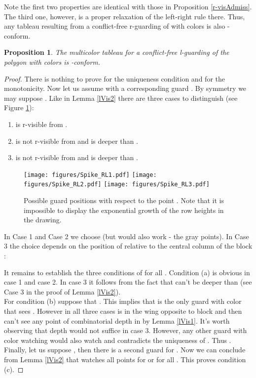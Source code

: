 \documentclass[a4paper,USenglish,numberwithinsect]{lipics}
\theoremstyle{plain}
\newtheorem{proposition}[theorem]{Proposition}
\begin{document}
Note the first two properties are identical with
those 
in Proposition \ref{r-visAdmiss}.
The third one, however,  is a proper relaxation of the left-right rule  there.
Thus, any tableau  resulting from a conflict-free
r-guarding
of  with  colors is also -conform.
\begin{proposition} \label{l-visAdmiss}
The multicolor tableau   for a
conflict-free
l-guarding of the polygon  with  colors is
-conform.
\end{proposition}
\begin{proof}
There is nothing to prove for the uniqueness condition and for the
monotonicity.
Now let us assume  with a
corresponding guard .
By symmetry we may suppose . Like in  Lemma
\ref{lVis2}
there are three cases to distinguish (see Figure \ref{three_guard_pos}):
\begin{enumerate}
\item  is r-visible from .
\item  is not r-visible from  and  is deeper than .
\item   is not r-visible from  and  is deeper than .
\end{enumerate}
\begin{figure}
\centering
\texttt{[image: figures/Spike\_RL1.pdf]}\quad\quad
\texttt{[image: figures/Spike\_RL2.pdf]}
\texttt{[image: figures/Spike\_RL3.pdf]}
\caption{Possible guard positions  with respect to the
point . Note that it is impossible to
  display the exponential growth of the row heights in the drawing.}
\label{three_guard_pos}
\end{figure}
In Case 1 and Case 2 we choose  (but  would also work -
the gray points).
In Case 3 the choice depends on the position of  relative to the central
column  of the block :

It remains to establish the three conditions of  for all
. Condition (a) is obvious in case 1 and case 2. In
case 3 it follows from
the fact that  can't be deeper than  (see
Case 3 in the proof of
Lemma \ref{lVis2}).
\\
For condition (b) suppose that  . This implies that 
is the only guard with
color  that sees . However in all three
cases  is in the wing opposite  to  block  and then 
can't see any point of
combinatorial depth  in  by Lemma \ref{lVis1}.
It's worth observing that
depth   would not suffice in case 3.
However, any other guard with color  watching  would also watch 
 and
contradicts the uniqueness of . Thus .
\\
Finally, let us suppose , then there is a second
guard 
for  . Now  we can conclude from  Lemma \ref{lVis2} that 
watches
all  points  for    or for all .
This proves condition (c).
\end{proof}
\end{document}
